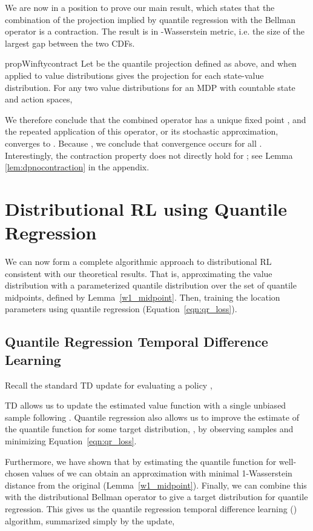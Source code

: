 \documentclass[letterpaper]{article}
\begin{document}
We are now in a position to prove our main result, which states that the combination of the projection implied by quantile regression with the Bellman operator is a contraction. The result is in -Wasserstein metric, i.e. the size of the largest gap between the two CDFs.
\begin{restatable}{prop}{Winftycontract}
Let  be the quantile projection defined as above, and when applied to value distributions gives the projection for each state-value distribution. For any two value distributions  for an MDP with countable state and action spaces,

\end{restatable}
We therefore conclude that the combined operator  has a unique fixed point , and the repeated application of this operator, or its stochastic approximation, converges to . Because , we conclude that convergence occurs for all . Interestingly, the contraction property does not directly hold for ; see Lemma \ref{lem:dpnocontraction} in the appendix.

\section{Distributional RL using Quantile Regression}
We can now form a complete algorithmic approach to distributional RL consistent with our theoretical results. That is, approximating the value distribution with a parameterized quantile distribution over the set of quantile midpoints, defined by Lemma~\ref{w1_midpoint}. Then, training the location parameters using quantile regression (Equation~\ref{eqn:qr_loss}).

\subsection{Quantile Regression Temporal Difference Learning}

Recall the standard TD update for evaluating a policy ,

TD allows us to update the estimated value function with a single unbiased sample following . Quantile regression also allows us to improve the estimate of the quantile function for some target distribution, , by observing samples  and minimizing Equation~\ref{eqn:qr_loss}.

Furthermore, we have shown that by estimating the quantile function for well-chosen values of  we can obtain an approximation with minimal 1-Wasserstein distance from the original (Lemma~\ref{w1_midpoint}). Finally, we can combine this with the distributional Bellman operator to give a target distribution for quantile regression. This gives us the quantile regression temporal difference learning () algorithm, summarized simply by the update,
\end{document}
